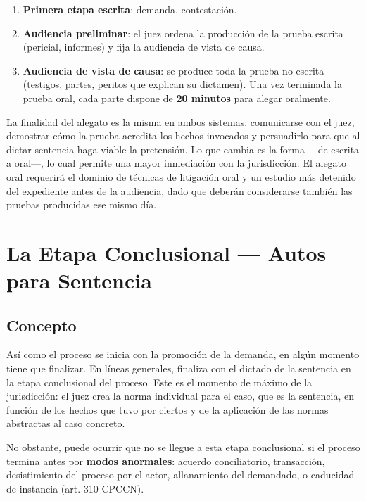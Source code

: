 \documentclass[12pt,oneside]{book}
\begin{document}
\begin{enumerate}
    \item \textbf{Primera etapa escrita}: demanda, contestación.
    \item \textbf{Audiencia preliminar}: el juez ordena la producción de la prueba escrita (pericial, informes) y fija la audiencia de vista de causa.
    \item \textbf{Audiencia de vista de causa}: se produce toda la prueba no escrita (testigos, partes, peritos que explican su dictamen). Una vez terminada la prueba oral, cada parte dispone de \textbf{20 minutos} para alegar oralmente.
\end{enumerate}

La finalidad del alegato es la misma en ambos sistemas: comunicarse con el juez, demostrar cómo la prueba acredita los hechos invocados y persuadirlo para que al dictar sentencia haga viable la pretensión. Lo que cambia es la forma —de escrita a oral—, lo cual permite una mayor inmediación con la jurisdicción. El alegato oral requerirá el dominio de técnicas de litigación oral y un estudio más detenido del expediente antes de la audiencia, dado que deberán considerarse también las pruebas producidas ese mismo día.

\chapter{La Etapa Conclusional --- Autos para Sentencia}

\section{Concepto}

Así como el proceso se inicia con la promoción de la demanda, en algún momento tiene que finalizar. En líneas generales, finaliza con el dictado de la sentencia en la etapa conclusional del proceso. Este es el momento de máximo de la jurisdicción: el juez crea la norma individual para el caso, que es la sentencia, en función de los hechos que tuvo por ciertos y de la aplicación de las normas abstractas al caso concreto.

No obstante, puede ocurrir que no se llegue a esta etapa conclusional si el proceso termina antes por \textbf{modos anormales}: acuerdo conciliatorio, transacción, desistimiento del proceso por el actor, allanamiento del demandado, o caducidad de instancia (art. 310 CPCCN).
\end{document}
